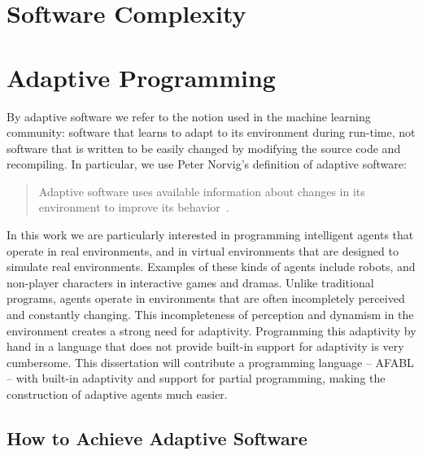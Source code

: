 \cite{mernik2005when}


\section{Software Complexity}


\cite{mccabe1976complexity}


\cite{gill1991cyclomatic}


\cite{weyuker1988evaluating}


\cite{mccabe1989design}


\cite{kearney1986software}


\cite{shao2003new}



\section{Adaptive Programming}

By adaptive software we refer to the notion used in the machine learning community: software that learns to adapt to its environment during run-time, not software that is written to be easily changed by modifying the source code and recompiling.  In particular, we use Peter Norvig's definition of adaptive software:

\begin{quote}
Adaptive software uses available information about changes in its
environment to improve its behavior~\cite{norvig1998adaptive}.
\end{quote}

In this work we are particularly interested in programming intelligent agents that operate in real environments, and in virtual environments that are designed to simulate real environments.  Examples of these kinds of agents include robots, and non-player characters in interactive games and dramas.  Unlike traditional programs, agents operate in environments that are often incompletely perceived and constantly changing.  This incompleteness of perception and dynamism in the environment creates a strong need for adaptivity.  Programming this adaptivity by hand in a language that does not provide built-in support for adaptivity is very cumbersome.  This dissertation will contribute a programming language -- AFABL -- with built-in adaptivity and support for partial programming, making the construction of adaptive agents much easier.


\subsection{How to Achieve Adaptive Software}

